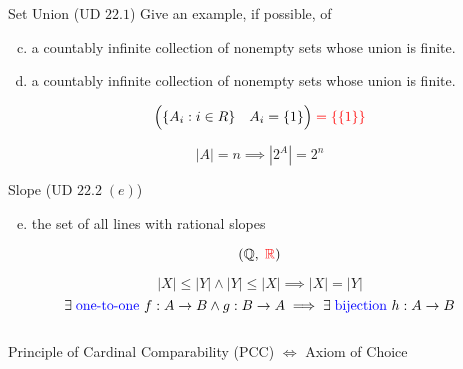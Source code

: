 \begin{frame}{}
  \begin{exampleblock}{Set Union (UD $22.1$)}
    Give an example, if possible, of
    \begin{enumerate}[(a)]
      \setcounter{enumi}{2}
      \item a countably infinite collection of  nonempty sets whose union is finite.
      \setcounter{enumi}{1}
      \item a countably infinite collection of nonempty sets whose union is finite.
    \end{enumerate}
  \end{exampleblock}

  \[
    \Big(\{A_i: i \in R\} \quad A_{i} = \{1\}\Big) \;\textcolor{red}{= \{\{1\}\}}
  \]

  \pause
  \[
    |A| = n \implies |2^{A}| = 2^n
  \]
\end{frame}

\begin{frame}{}
  \begin{exampleblock}{Slope (UD $22.2 \;(e)$)}
    \begin{enumerate}[(a)]
      \setcounter{enumi}{4}
      \item the set of all lines with rational slopes
    \end{enumerate}
  \end{exampleblock}

  \pause
  \[
    (\mathbb{Q}, \;\textcolor{red}{\mathbb{R}})
  \]
\end{frame}

\begin{frame}{}
  \centerline{\large {}}

  \pause
  \vspace{0.30cm}
  \begin{theorem}
    \[
      |X| \le |Y| \land |Y| \le |X| \implies |X| = |Y|
    \]
    \pause
    \[
      \exists\; \text{\textcolor{blue}{one-to-one} } f: A \to B \land g: B \to A \implies \exists\; \text{\textcolor{blue}{bijection} } h: A \to B
    \]
  \end{theorem}

  \pause
  \begin{columns}
      \pause
      \pause
  \end{columns}
\end{frame}

\begin{frame}{}
  \centerline{\large {}}

  \pause
  \vspace{0.50cm}
  \begin{theorem}[PCC]
    \begin{center}
      Principle of Cardinal Comparability (PCC) $\iff$ Axiom of Choice
    \end{center}
  \end{theorem}
\end{frame}
